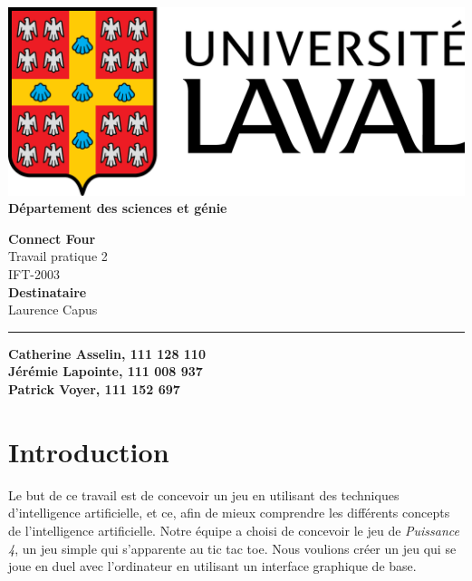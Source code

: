 \documentclass[12pt]{article}
\begin{document}
\begin{titlepage}
	\begin{minipage}{0.5\textwidth}
		\begin{flushleft}
			\includegraphics[scale=0.1]{logo.png} \\
			\textbf{Département des sciences et génie}
		\end{flushleft}
	\end{minipage}
	\vspace{150px}
	\begin{center} \large
		\textbf{Connect Four} \\
		Travail pratique 2 \\
		IFT-2003 \\
		\vspace{150px}
		\textbf{Destinataire} \\
		Laurence Capus
	\end{center}
	\vfill
	\rule{\linewidth}{.5pt}
	\newline
	\textbf{Catherine Asselin, 111 128 110} \\
	\textbf{Jérémie Lapointe, 111 008 937} \\
	\textbf{Patrick Voyer, 111 152 697}
\end{titlepage}

\newpage
\setcounter{page}{1}

\section*{Introduction}
Le but de ce travail est de concevoir un jeu en utilisant des techniques d'intelligence artificielle, et ce, afin de mieux comprendre les différents concepts de l'intelligence artificielle. Notre équipe a choisi de concevoir le jeu de \textit{Puissance 4}, un jeu simple qui s'apparente au tic tac toe. Nous voulions créer un jeu qui se joue en duel avec l'ordinateur en utilisant un interface graphique de base.
\end{document}
